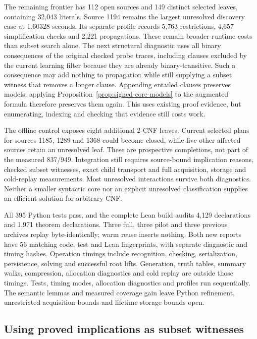 \documentclass[11pt,a4paper]{article}
\numberwithin{equation}{section}
\theoremstyle{plain}
\theoremstyle{definition}
\theoremstyle{remark}
\begin{document}
The remaining frontier has 112 open sources and 149 distinct selected leaves, containing 32,043 literals. Source 1194 remains the largest unresolved discovery case at 1.60328 seconds. Its separate profile records 5,763 restrictions, 4,657 simplification checks and 2,221 propagations. These remain broader runtime costs than subset search alone. The next structural diagnostic uses all binary consequences of the original checked probe traces, including clauses excluded by the current learning filter because they are already binary-transitive. Such a consequence may add nothing to propagation while still supplying a subset witness that removes a longer clause. Appending entailed clauses preserves models; applying Proposition~\ref{prop:signed-core-models} to the augmented formula therefore preserves them again. This uses existing proof evidence, but enumerating, indexing and checking that evidence still costs work.

The offline control exposes eight additional 2-CNF leaves. Current selected plans for sources 1185, 1289 and 1368 could become closed, while five other affected sources retain an unresolved leaf. These are prospective completions, not part of the measured 837/949. Integration still requires source-bound implication reasons, checked subset witnesses, exact child transport and full acquisition, storage and cold-replay measurements. Most unresolved interactions survive both diagnostics. Neither a smaller syntactic core nor an explicit unresolved classification supplies an efficient solution for arbitrary CNF.

All 395 Python tests pass, and the complete Lean build audits 4,129 declarations and 1,971 theorem declarations. Three full, three pilot and three previous archives replay byte-identically; warm reuse inserts nothing. Both new reports have 56 matching code, test and Lean fingerprints, with separate diagnostic and timing hashes. Operation timings include recognition, checking, serialization, persistence, solving and successful root lifts. Generation, truth tables, summary walks, compression, allocation diagnostics and cold replay are outside those timings. Tests, timing modes, allocation diagnostics and profiles run sequentially. The semantic lemmas and measured coverage gain leave Python refinement, unrestricted acquisition bounds and lifetime storage bounds open.

\subsection{Using proved implications as subset witnesses}
\label{sec:implied-subsumption}
\end{document}
